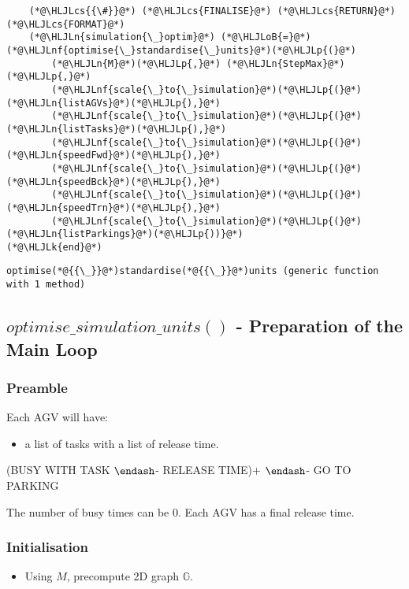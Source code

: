 \documentclass[12pt,a4paper]{article}
\newcommand{\HLJLk}[1]{\textcolor[RGB]{148,91,176}{\textbf{#1}}}
\newcommand{\HLJLn}[1]{#1}
\newcommand{\HLJLnf}[1]{\textcolor[RGB]{66,102,213}{#1}}
\newcommand{\HLJLoB}[1]{\textcolor[RGB]{102,102,102}{\textbf{#1}}}
\newcommand{\HLJLp}[1]{#1}
\newcommand{\HLJLcs}[1]{\textcolor[RGB]{153,153,119}{\textit{#1}}}
\begin{document}
\begin{lstlisting}
    (*@\HLJLcs{{\#}}@*) (*@\HLJLcs{FINALISE}@*) (*@\HLJLcs{RETURN}@*) (*@\HLJLcs{FORMAT}@*)
    (*@\HLJLn{simulation{\_}optim}@*) (*@\HLJLoB{=}@*) (*@\HLJLnf{optimise{\_}standardise{\_}units}@*)(*@\HLJLp{(}@*)
        (*@\HLJLn{M}@*)(*@\HLJLp{,}@*) (*@\HLJLn{StepMax}@*)(*@\HLJLp{,}@*)
        (*@\HLJLnf{scale{\_}to{\_}simulation}@*)(*@\HLJLp{(}@*)(*@\HLJLn{listAGVs}@*)(*@\HLJLp{),}@*)
        (*@\HLJLnf{scale{\_}to{\_}simulation}@*)(*@\HLJLp{(}@*)(*@\HLJLn{listTasks}@*)(*@\HLJLp{),}@*)
        (*@\HLJLnf{scale{\_}to{\_}simulation}@*)(*@\HLJLp{(}@*)(*@\HLJLn{speedFwd}@*)(*@\HLJLp{),}@*)
        (*@\HLJLnf{scale{\_}to{\_}simulation}@*)(*@\HLJLp{(}@*)(*@\HLJLn{speedBck}@*)(*@\HLJLp{),}@*)
        (*@\HLJLnf{scale{\_}to{\_}simulation}@*)(*@\HLJLp{(}@*)(*@\HLJLn{speedTrn}@*)(*@\HLJLp{),}@*)
        (*@\HLJLnf{scale{\_}to{\_}simulation}@*)(*@\HLJLp{(}@*)(*@\HLJLn{listParkings}@*)(*@\HLJLp{))}@*)
(*@\HLJLk{end}@*)
\end{lstlisting}

\begin{lstlisting}
optimise(*@{{\_}}@*)standardise(*@{{\_}}@*)units (generic function with 1 method)
\end{lstlisting}


\subsection{$optimise\_simulation\_units()$ - Preparation of the Main Loop}
\subsubsection{Preamble}
Each AGV will have:

\begin{itemize}
\item a list of tasks with a list of release time.

\end{itemize}
(BUSY WITH TASK \ensuremath{\endash}- RELEASE TIME)+ \ensuremath{\endash}- GO TO PARKING

The number of busy times can be 0. Each AGV has a final release time.

\subsubsection{Initialisation}
\begin{itemize}
\item Using $M$, precompute 2D graph $\mathbb{G}$.

\end{itemize}
\end{document}
